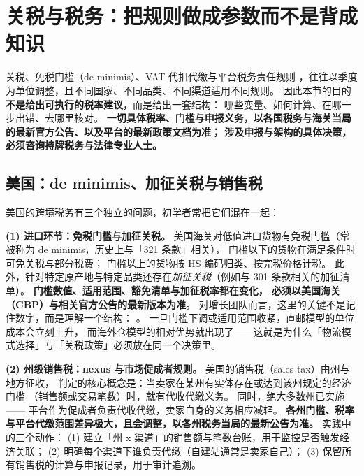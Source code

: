 \section{关税与税务：把规则做成参数而不是背成知识}
\label{sec:cbec-tax}

\begin{pitfall}[本节所有规则都会变]
关税、免税门槛（de minimis）、VAT 代扣代缴与平台税务责任规则
，往往以季度为单位调整，且不同国家、不同品类、不同渠道适用不同规则。
因此本节的目的\textbf{不是给出可执行的税率建议}，而是给出一套结构：
哪些变量、如何计算、在哪一步出错、去哪里核对。
\textbf{一切具体税率、门槛与申报义务，以各国税务与海关当局的最新官方公告、以及平台的最新政策文档为准；
涉及申报与架构的具体决策，必须咨询持牌税务与法律专业人士。}
\end{pitfall}

\subsection{美国：de minimis、加征关税与销售税}

美国的跨境税务有三个独立的问题，初学者常把它们混在一起：

\textbf{(1) 进口环节：免税门槛与加征关税。}
美国海关对低值进口货物有免税门槛（常被称为 de minimis，历史上与「321 条款」相关），
门槛以下的货物在满足条件时可免关税与部分税费；
门槛以上的货物按 HS 编码归类、按完税价格计税。
此外，针对特定原产地与特定品类还存在\emph{加征关税}（例如与 301 条款相关的加征清单）。
\textbf{门槛数值、适用范围、豁免清单与加征税率都在变化，
必须以美国海关（CBP）与相关官方公告的最新版本为准}。
对增长团队而言，这里的关键不是记住数字，而是理解一个结构：
。
一旦门槛下调或适用范围收紧，直邮模型的单位成本会立刻上升，
而海外仓模型的相对优势就出现了——这就是为什么「物流模式选择」与「关税政策」必须放在同一个决策里。

\textbf{(2) 州级销售税：nexus 与市场促成者规则。}
美国的销售税（sales tax）由州与地方征收，
判定的核心概念是：当卖家在某州有实体存在或达到该州规定的经济门槛
（销售额或交易笔数）时，就有代收代缴义务。
同时，绝大多数州已实施——
平台作为促成者负责代收代缴，卖家自身的义务相应减轻。
\textbf{各州门槛、税率与平台代缴范围差异极大，且会调整，以各州税务当局的最新公告为准。}
实践中的三个动作：
(1) 建立「州 x 渠道」的销售额与笔数台账，用于监控是否触发经济关联；
(2) 明确每个渠道下谁负责代缴（自建站通常是卖家自己）；
(3) 保留所有销售税的计算与申报记录，用于审计追溯。

